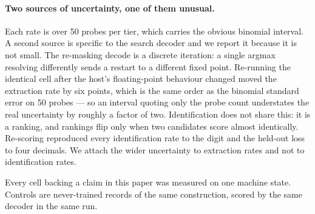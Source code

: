 \paragraph{Two sources of uncertainty, one of them unusual.}
Each rate is over 50 probes per tier, which carries the obvious binomial interval. A second source is
specific to the search decoder and we report it because it is not small. The re-masking decode is a
discrete iteration: a single argmax resolving differently sends a restart to a different fixed point.
Re-running the identical cell after the host's floating-point behaviour changed moved the extraction
rate by six points, which is the same order as the binomial standard error on 50 probes --- so an
interval quoting only the probe count understates the real uncertainty by roughly a factor of two.
Identification does not share this: it is a ranking, and rankings flip only when two candidates score
almost identically. Re-scoring reproduced every identification rate to the digit and the held-out
loss to four decimals. We attach the wider uncertainty to extraction rates and not to identification
rates.

Every cell backing a claim in this paper was measured on one machine state. Controls are never-trained
records of the same construction, scored by the same decoder in the same run.
